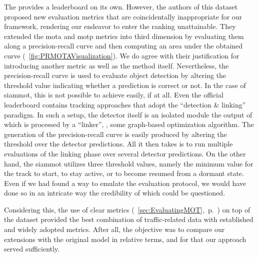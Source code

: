 The \uadetrac{} provides a leaderboard on its own. However, the authors of this dataset proposed new evaluation metrics that are coincidentally inappropriate for our framework, rendering our endeavor to enter the ranking unattainable. They extended the \gls{mota} and \gls{motp} metrics into third dimension by evaluating them along a precision-recall curve and then computing an area under the obtained curve (\figtext{}~\ref{fig:PRMOTAVisualization}). We do agree with their justification for introducing another metric as well as the method itself. Nevertheless, the precision-recall curve is used to evaluate object detection by altering the threshold value indicating whether a prediction is correct or not. In the case of \gls{siammot}, this is not possible to achieve easily, if at all. Even the official \uadetrac{} leaderboard contains tracking approaches that adopt the ``detection \& linking'' paradigm. In such a setup, the detector itself is an isolated module the output of which is processed by a ``linker'', \egtext{}, some graph-based optimization algorithm. The generation of the precision-recall curve is easily produced by altering the threshold over the detector predictions. All it then takes is to run multiple evaluations of the linking phase over several detector predictions. On the other hand, the \gls{siammot} utilizes three threshold values, namely the minimum value for the track to start, to stay active, or to become resumed from a dormant state. Even if we had found a way to emulate the evaluation protocol, we would have done so in an intricate way the credibility of which could be questioned.

Considering this, the use of \gls{clear} metrics (\sectiontext{}~\ref{sec:EvaluatingMOT},~p.~\pageref{sec:EvaluatingMOT}) on top of the \uadetrac{} dataset provided the best combination of traffic-related data with established and widely adopted metrics. After all, the objective was to compare our extensions with the original model in relative terms, and for that our approach served sufficiently.
